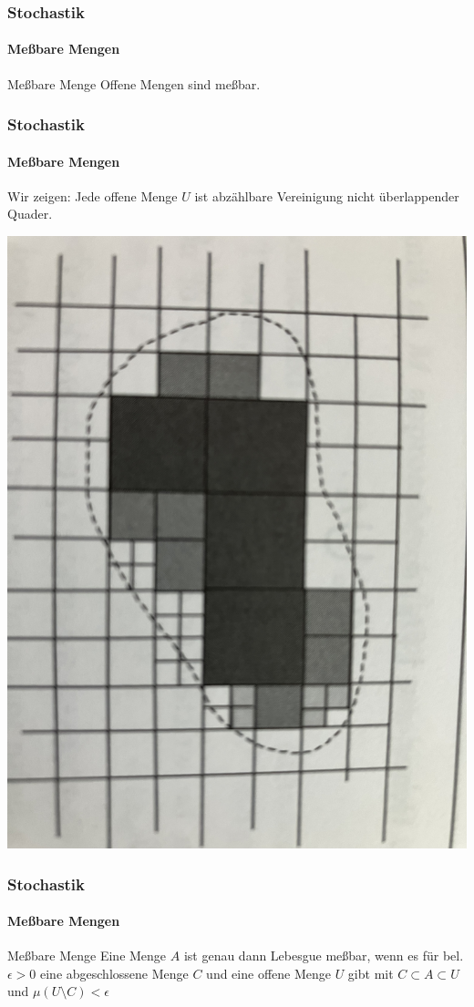 \documentclass{beamer}
\begin{document}
 \begin{frame}
    \frametitle{Stochastik}
\framesubtitle{Meßbare Mengen}

    \begin{block}{Meßbare Menge}
        Offene Mengen sind meßbar.
\end{block}

\end{frame}

 \begin{frame}
    \frametitle{Stochastik}
\framesubtitle{Meßbare Mengen}
Wir zeigen: Jede offene Menge $U$ ist abzählbare Vereinigung nicht überlappender Quader. 

\includegraphics[scale=0.04]{img/openmeasurable.jpg}
 \end{frame}


\begin{frame}
    \frametitle{Stochastik}
\framesubtitle{Meßbare Mengen}

\begin{block}{Meßbare Menge}
Eine Menge $A$ ist genau dann Lebesgue meßbar, 
wenn es für bel. $\epsilon > 0$ 
eine abgeschlossene Menge $C$ und eine offene Menge $U$ gibt 
mit $C \subset A \subset U$ und 
$\mu (U \setminus C ) < \epsilon $
\end{block}

 \end{frame}
\end{document}
